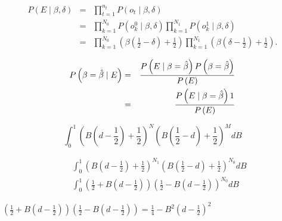 \documentclass{amsart}
\theoremstyle{definition}
\theoremstyle{plain}
\numberwithin{equation}{section}
\begin{document}
\bigskip 
\begin{eqnarray*}
P\left( E\mid \beta ,\delta \right)  &=&\prod_{t=1}^{n_{t}}P\left( o_{t}\mid
\beta ,\delta \right)  \\
&=&\prod_{k=1}^{N_{0}}P\left( o_{k}^{0}\mid \beta ,\delta \right)
\prod_{k=1}^{N_{1}}P\left( o_{k}^{1}\mid \beta ,\delta \right)  \\
&=&\prod_{k=1}^{N_{0}}\left( \beta \left( \frac{1}{2}-\delta \right) +\frac{1%
}{2}\right) \prod_{k=1}^{N_{1}}\left( \beta \left( \delta -\frac{1}{2}%
\right) +\frac{1}{2}\right) .
\end{eqnarray*}

\begin{eqnarray*}
P\left( \beta =\hat{\beta}\mid E\right)  &=&\frac{P\left( E\mid \beta =\hat{%
\beta}\right) P\left( \beta =\hat{\beta}\right) }{P\left( E\right) } \\
&=&\frac{P\left( E\mid \beta =\hat{\beta}\right) 1}{P\left( E\right) }
\end{eqnarray*}

\begin{equation*}
\int_{0}^{1}\left( B\left( d-\frac{1}{2}\right) +\frac{1}{2}\right)
^{N}\left( B\left( \frac{1}{2}-d\right) +\frac{1}{2}\right) ^{M}dB
\end{equation*}

\begin{eqnarray*}
&&\int_{0}^{1}\left( B\left( d-\frac{1}{2}\right) +\frac{1}{2}\right)
^{N_{1}}\left( B\left( \frac{1}{2}-d\right) +\frac{1}{2}\right) ^{N_{0}}dB \\
&&\int_{0}^{1}\left( \frac{1}{2}+B\left( d-\frac{1}{2}\right) \right) \left( 
\frac{1}{2}-B\left( d-\frac{1}{2}\right) \right) ^{N_{0}}dB
\end{eqnarray*}

$\left( \frac{1}{2}+B\left( d-\frac{1}{2}\right) \right) \left( \frac{1}{2}%
-B\left( d-\frac{1}{2}\right) \right) =\frac{1}{4}-B^{2}\left( d-\frac{1}{2}%
\right) ^{2}$



\end{document}
